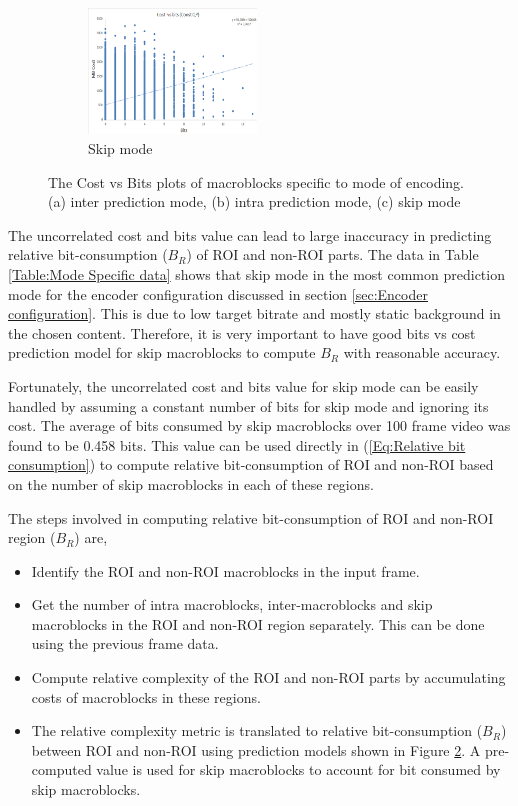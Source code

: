 \documentclass[11pt]{article} %
\begin{document}
\begin{figure}
	\begin{subfigure}[t]{\textwidth}
		\centering
		\includegraphics[width=0.49\textwidth]{CostVsBits/const_QP/CostvsBits_ConstQP_skip.png}
		\caption{Skip mode}
		\label{fig: Cost vs bits mode skip}
	\end{subfigure}
	\caption{The Cost vs Bits plots of macroblocks specific to mode of encoding. (a) inter prediction mode, (b) intra prediction mode, (c) skip mode}
	\label{fig: Cost vs bits mode}
\end{figure}
 
The uncorrelated cost and bits value can lead to large inaccuracy in predicting relative bit-consumption ($B_R$) of ROI and non-ROI parts. The data in Table \ref{Table:Mode Specific data} shows that skip mode in the most common prediction mode for the encoder configuration discussed in section \ref{sec:Encoder configuration}. This is due to low target bitrate and mostly static background in the chosen content. Therefore, it is very important to have good bits vs cost prediction model for skip macroblocks to compute $B_R$ with reasonable accuracy.

Fortunately, the uncorrelated cost and bits value for skip mode can be easily handled by assuming a constant number of bits for skip mode and ignoring its cost. The average of bits consumed by skip macroblocks over 100 frame video was found to be 0.458 bits. This value can be used directly in (\ref{Eq:Relative bit consumption}) to compute relative bit-consumption of ROI and non-ROI based on the number of skip macroblocks in each of these regions.

The steps involved in computing relative bit-consumption of ROI and non-ROI region ($B_R$) are,
\begin{itemize}
	\item Identify the ROI and non-ROI macroblocks in the input frame.
	\item Get the number of intra macroblocks, inter-macroblocks and skip macroblocks in the ROI and non-ROI region separately. This can be done using the previous frame data.
	\item Compute relative complexity of the ROI and non-ROI parts by accumulating costs of macroblocks in these regions.
	\item The relative complexity metric is translated to relative bit-consumption ($B_R$) between ROI and non-ROI using  prediction models shown in Figure \ref{fig: Cost vs bits mode}. A pre-computed value is used for skip macroblocks to account for bit consumed by skip macroblocks.
\end{itemize}
\end{document}
